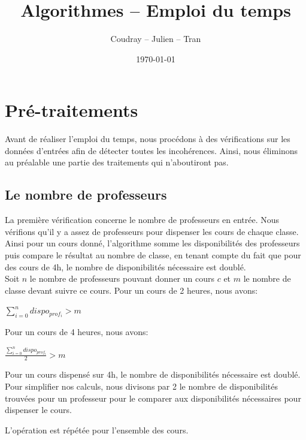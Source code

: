 \documentclass[12pt,a4paper,french]{article}
\begin{document}
\title{Algorithmes -- Emploi du temps}
\author{Coudray -- Julien -- Tran}
\date{\today}
\maketitle

\section{Pré-traitements}
Avant de réaliser l'emploi du temps, nous procédons à des vérifications sur les données d'entrées afin de détecter toutes les incohérences. Ainsi, nous éliminons au préalable une partie des traitements qui n'aboutiront pas.

\subsection{Le nombre de professeurs}
La première vérification concerne le nombre de professeurs en entrée. Nous vérifions qu'il y a assez de professeurs pour dispenser les cours de chaque classe.
Ainsi pour un cours donné, l'algorithme somme les disponibilités des professeurs puis compare le résultat au nombre de classe, en tenant compte du fait que pour des cours de 4h, le nombre de disponibilités nécessaire est doublé.\\

Soit $n$ le nombre de professeurs pouvant donner un cours $c$ et $m$ le nombre de classe devant suivre ce cours.
Pour un cours de 2 heures, nous avons:
\begin{center}
$\sum_{i=0}^n dispo_{prof_i} > m$
\end{center}

Pour un cours de 4 heures, nous avons: 
\begin{center}
$\frac{\sum_{i=0}^n dispo_{prof_i}}{2} > m$
\end{center}

Pour un cours dispensé sur 4h, le nombre de disponibilités nécessaire est doublé. Pour simplifier nos calculs, nous divisons par 2 le nombre de disponibilités trouvées pour un professeur pour le comparer aux disponibilités nécessaires pour dispenser le cours.

L'opération est répétée pour l'ensemble des cours. 

\newpage
\end{document}
